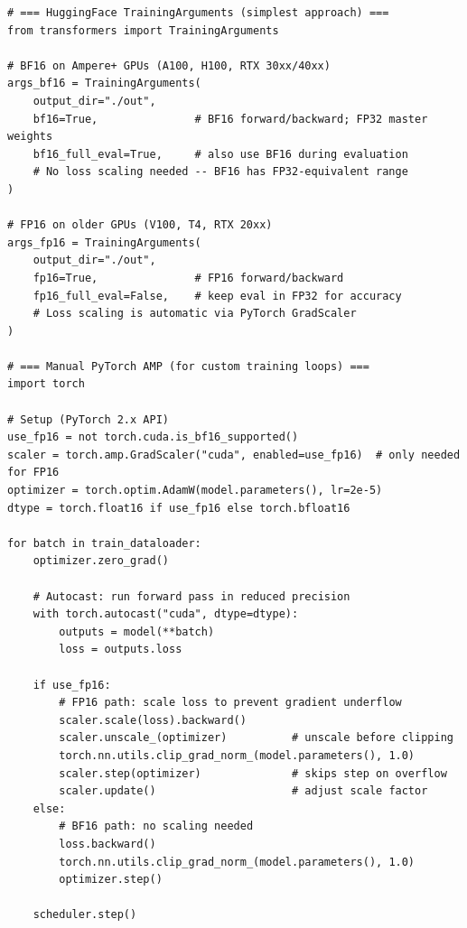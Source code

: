 \begin{lstlisting}[style=pythonstyle, caption={Mixed precision training with HuggingFace and manual PyTorch AMP.}]
# === HuggingFace TrainingArguments (simplest approach) ===
from transformers import TrainingArguments

# BF16 on Ampere+ GPUs (A100, H100, RTX 30xx/40xx)
args_bf16 = TrainingArguments(
    output_dir="./out",
    bf16=True,               # BF16 forward/backward; FP32 master weights
    bf16_full_eval=True,     # also use BF16 during evaluation
    # No loss scaling needed -- BF16 has FP32-equivalent range
)

# FP16 on older GPUs (V100, T4, RTX 20xx)
args_fp16 = TrainingArguments(
    output_dir="./out",
    fp16=True,               # FP16 forward/backward
    fp16_full_eval=False,    # keep eval in FP32 for accuracy
    # Loss scaling is automatic via PyTorch GradScaler
)

# === Manual PyTorch AMP (for custom training loops) ===
import torch

# Setup (PyTorch 2.x API)
use_fp16 = not torch.cuda.is_bf16_supported()
scaler = torch.amp.GradScaler("cuda", enabled=use_fp16)  # only needed for FP16
optimizer = torch.optim.AdamW(model.parameters(), lr=2e-5)
dtype = torch.float16 if use_fp16 else torch.bfloat16

for batch in train_dataloader:
    optimizer.zero_grad()

    # Autocast: run forward pass in reduced precision
    with torch.autocast("cuda", dtype=dtype):
        outputs = model(**batch)
        loss = outputs.loss

    if use_fp16:
        # FP16 path: scale loss to prevent gradient underflow
        scaler.scale(loss).backward()
        scaler.unscale_(optimizer)          # unscale before clipping
        torch.nn.utils.clip_grad_norm_(model.parameters(), 1.0)
        scaler.step(optimizer)              # skips step on overflow
        scaler.update()                     # adjust scale factor
    else:
        # BF16 path: no scaling needed
        loss.backward()
        torch.nn.utils.clip_grad_norm_(model.parameters(), 1.0)
        optimizer.step()

    scheduler.step()
\end{lstlisting}

